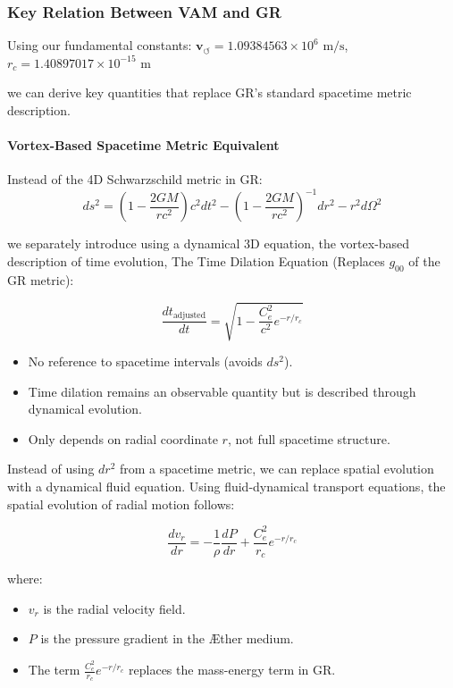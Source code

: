\subsubsection*{Key Relation Between VAM and GR}
Using our fundamental constants:
$\mathbf{v}_{\scriptscriptstyle\boldsymbol{\circlearrowleft}} = 1.09384563 \times 10^6 \text{ m/s}$, $r_c = 1.40897017 \times 10^{-15} \text{ m}$

we can derive key quantities that replace GR's standard spacetime metric description.

\paragraph{Vortex-Based Spacetime Metric Equivalent}
Instead of the 4D Schwarzschild metric in GR:
\begin{equation*}
    ds^2 = \left( 1 - \frac{2GM}{rc^2} \right) c^2 dt^2 - \left( 1 - \frac{2GM}{rc^2} \right)^{-1} dr^2 - r^2 d\Omega^2
\end{equation*}

we separately introduce using a dynamical 3D equation, the vortex-based description of time evolution,
The Time Dilation Equation (Replaces $g_{00}$ of the GR metric):

\begin{equation*}
    \boxed{\frac{d t_\text{adjusted}}{d t} = \sqrt{1 - \frac{C_e^2}{c^2} e^{-r/r_c}}}
\end{equation*}


\begin{itemize}
\item No reference to spacetime intervals (avoids $ ds^2 $).
\item Time dilation remains an observable quantity but is described through dynamical evolution.
\item Only depends on radial coordinate $r$, not full spacetime structure.
\end{itemize}


Instead of using $ dr^2 $ from a spacetime metric, we can replace spatial evolution with a dynamical fluid equation. Using fluid-dynamical transport equations, the spatial evolution of radial motion follows:

\begin{equation*}
    \frac{d v_r}{d r} = - \frac{1}{\rho} \frac{d P}{d r} + \frac{C_e^2}{r_c} e^{-r/r_c}
\end{equation*}

where:

\begin{itemize}
\item $v_r$ is the radial velocity field.
\item $P$ is the pressure gradient in the Æther medium.
\item The term  $\frac{C_e^2}{r_c} e^{-r/r_c}$ replaces the mass-energy term in GR.
\end{itemize}

